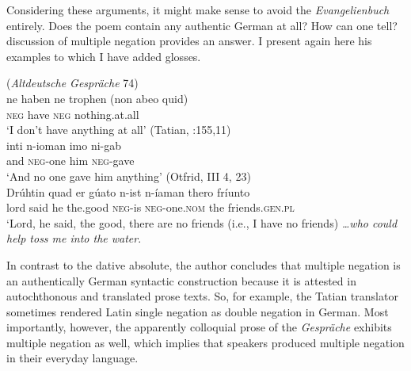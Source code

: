 Considering these arguments, it might make sense to avoid the \textit{Evangelienbuch} entirely. Does the poem contain any authentic German at all? How can one tell?  discussion of multiple negation provides an answer. I present again here his examples to which I have added glosses.

\ea%
    \label{ex:2:7}
    \ea (\textit{Altdeutsche Gespräche} 74)\\
\gll          ne    haben   ne    trophen       (non abeo quid)\\
  \textsc{neg}    have  \textsc{neg}    nothing.at.all\\
\glt   ‘I don’t have anything at all’
\ex (Tatian, \citealt{Masser1994}:155,11)\\
\gll  inti    n-ioman    imo    ni-gab\\
  and    \textsc{neg}-one     him    \textsc{neg}-gave\\
\glt  ‘And no one gave him anything’ 
\ex (Otfrid, III 4, 23)\\
\gll Drúhtin  quad  er  gúato     n-ist    n-íaman    thero fríunto\\
lord    said   he  the.good    \textsc{neg}-is  \textsc{neg}-one.\textsc{nom}  the friends.\textsc{gen.pl}\\
\glt ‘Lord, he said, the good, there are no friends (i.e., I have no friends) \textit{…who could help toss me into the water}. 
    \z
  \z

\noindent In contrast to the dative absolute, the author concludes that multiple negation is an authentically German syntactic construction because it is attested in autochthonous and translated prose texts. So, for example, the Tatian translator sometimes rendered Latin single negation as double negation in German. Most importantly, however, the apparently colloquial prose of the \textit{Gespräche} exhibits multiple negation as well, which implies that speakers produced multiple negation in their everyday language.

